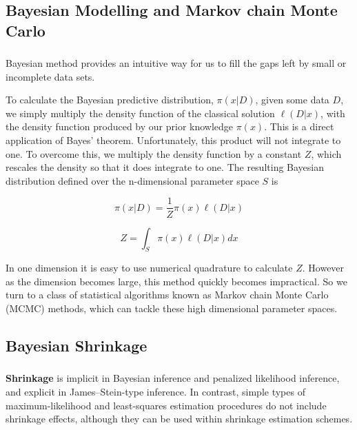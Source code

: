 \documentclass[c, dvipsnames]{beamer}  %
\begin{document}
\subsection{Bayesian Modelling and Markov chain Monte Carlo}


\begin{frame}[shrink=5]
\frametitle{\insertsection} 
\framesubtitle{\insertsubsection}

Bayesian method provides an intuitive way for us to fill the gaps left by small or incomplete data sets. 


To calculate the Bayesian predictive distribution, $\pi(x|D)$, given some data $D$,  we simply multiply the density function of the classical solution  $\ell (D|x)$,  with the density function produced by our prior knowledge $\pi(x)$. This is a direct application of Bayes’ theorem. Unfortunately, this product will not integrate to one. To overcome this, we multiply the density function by a constant $Z$, which rescales the density so that it does integrate to one. The resulting Bayesian distribution defined over the n-dimensional parameter space $S$ is

$$ \pi(x|D) = \frac{1}{Z} \pi(x) \ell(D|x)$$

$$ Z = \int_S \pi(x) \ell(D|x) dx$$

In one dimension it is easy to use numerical quadrature to calculate $Z$. However as the dimension becomes large, this method quickly becomes impractical. So we turn to a class of statistical algorithms known as Markov chain Monte Carlo (MCMC) methods, which can tackle these high dimensional parameter spaces.



\end{frame}





\subsection{Bayesian Shrinkage}


\begin{frame}[shrink=5]
\frametitle{\insertsection} 
\framesubtitle{\insertsubsection}

\textbf{Shrinkage} is implicit in Bayesian inference and penalized likelihood inference, and explicit in James–Stein-type inference. In contrast, simple types of maximum-likelihood and least-squares estimation procedures do not include shrinkage effects, although they can be used within shrinkage estimation schemes.
 
 
 
\end{frame}
\end{document}
